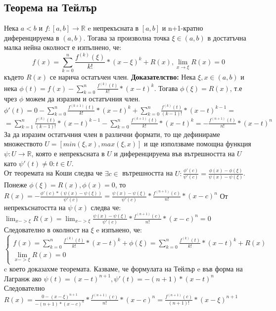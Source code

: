 \documentclass[fleqn,12pt]{article}
\begin{document}
\begin{flushleft}
\subsection{Теорема на Тейлър}
Нека $a<b$ и $f:[a,b]\rightarrow\mathbb{R}$ e непрекъсната в $[a,b]$ и n+1-кратно диференцируема в $(a,b)$. Тогава за произволна точка $\xi \in (a,b)$ в достатъчна малка нейна околност е изпълнено, че:
\[f(x)=\sum_{k = 0}^{n} \frac{f^{(k)}(\xi)}{k!}*(x-\xi)^k + R(x), \lim_{x \rightarrow \xi} R(x) = 0\]
където $R(x)$ се нарича остатъчен член.
\bigbreak
\textbf{Доказателство:}
Нека $\xi,x \in (a,b)$ и нека $\phi(t) = f(x) - \sum_{k = 0}^{n} \frac{f^{(k)}(t)}{k!}*(x-t)^{k}$.
Тогава $\phi(\xi)=R(x)$, т.е чрез $\phi$ можем да изразим и остатъчния член.
\bigbreak
$\phi'(t)=0 - \sum_{k=0}^{n} \frac{f^{(k+1)}(t)}{k!}*(x-t)^{k} +  \sum_{k=0}^{n}\frac{f^{(k)}(t)}{(k-1)!}*(x-t)^{k-1} =$
$=\sum_{k=1}^{n}\frac{f^{(k)}(t)}{(k-1)!}*(x-t)^{k-1} - \sum_{k=0}^{n} \frac{f^{(k+1)}(t)}{k!}*(x-t)^{k} = -\frac{f^{(n+1)}(t)}{n!}*(x-t)^n$
\bigbreak
За да изразим остатъчния член в различни формати, то ще дефинираме множеството $U=[min(\xi,x),max(\xi,x)]$ и ще използваме помощна функция $\psi:U\rightarrow\mathbb{R}$, която е непрекъсната в $U$
и диференцируема във вътрешността на $U$ като $\psi'(t) \neq 0 : t \in U$.\\
От теоремата на Коши следва че $\exists c \in$ вътрешността на $U: \frac{\phi'(c)}{\psi'(c)}=\frac{\phi(x)-\phi(\xi)}{\psi(x)-\psi(\xi)}$.
\bigbreak
Понеже $\phi(\xi) = R(x), \phi(x) = 0$, то $R(x) = -\frac{\phi'(c)*(\psi(x)-\psi(\xi))}{\psi'(c)} = \frac{\psi(x)-\psi(\xi)}{\psi'(c)}*\frac{f^{(n+1)}(c)}{n!}*(x-c)^n$\newline
От непрекъснатостта на $\psi(x)$ следва че: $\lim_{x->\xi} R(x) = \lim_{x->\xi} \frac{\psi(x)-\psi(\xi)}{\psi'(c)}*\frac{f^{(n+1)}(c)}{n!}*(x-c)^n = 0$
\bigbreak
Следователно в околност на $\xi$ e изпънено, че:
\[
\begin{cases}
    f(x) = \sum_{k = 0}^{n} \frac{f^{(k)}(t)}{k!}*(x-t)^{k} + \phi(\xi) = \sum_{k = 0}^{n} \frac{f^{(k)}(t)}{k!}*(x-t)^{k} + R(x)\\
    \lim_{x->\xi} R(x) = 0
\end{cases}
\]
c което доказахме теоремата. 
\bigbreak
Казваме, че формулата на Тейлър e във форма на Лагранж ако $\psi(t)=(x-t)^{n+1}, \psi'(t)=-(n+1)*(x-t)^n$\\
Следователно $R(x)=\frac{0-(x-\xi)^{n+1}}{-(n+1)*(x-c)^n}*\frac{f^{(n+1)}(c)}{n!}*(x-c)^n = \frac{f^{(n+1)}(c)}{(n+1)!}*(x-\xi)^{n+1}$

\end{flushleft}
\end{document}
